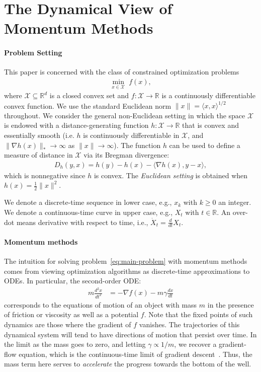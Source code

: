 \documentclass[11pt]{article}
\theoremstyle{plain}
\newcommand{\R}{{\mathbb R}}
\newcommand{\X}{{\mathcal X}}
\begin{document}
\section{The Dynamical View of Momentum Methods}

\paragraph{Problem Setting}
This paper is concerned with the class of constrained optimization problems
\begin{align}\label{eq:main-problem}
\min_{x \in \X} \; f(x),
\end{align}
where $\X \subseteq \R^d$ is a closed convex set and $f \colon \X \to \R$ is a continuously differentiable convex function. 
We use the standard Euclidean norm $\|x\| = \langle x,x \rangle^{1/2}$ throughout.
We consider the general non-Euclidean setting in which the space $\X$ is endowed with a distance-generating function $h \colon \X \to \R$ that is convex and essentially smooth (i.e. $h$ is continuously differentiable in $\X$, and $\|\nabla h(x)\|_* \to \infty$ as $\|x\| \to \infty$). The function $h$ can be used to define a measure of distance in $\X$ via its Bregman divergence:
\begin{align*}
D_h(y,x) = h(y) - h(x) - \langle \nabla h(x), y-x \rangle,
\end{align*}
which is nonnegative since $h$ is convex. 
The \emph{Euclidean setting} is obtained when $h(x) = \frac{1}{2} \|x\|^2$.

We denote a discrete-time sequence in lower case, e.g., $x_k$ with $k \ge 0$ an integer. We denote a continuous-time curve in upper case, e.g., $X_t$ with $t \in \R$. An over-dot means derivative with respect to time, i.e., $\dot X_t = \frac{d}{dt} X_t$.


\paragraph{Momentum methods}
The intuition for solving problem~\eqref{eq:main-problem} with momentum methods comes from viewing optimization algorithms as discrete-time approximations to ODEs. In particular, the second-order ODE:
 \begin{align}\label{eq:heavy-ball-ode}
 m \frac{d^2x}{dt^2}& = - \nabla f(x) - m \gamma \frac{dx}{dt}
 \end{align}
corresponds to the equations of motion of an object with mass $m$ in the presence of  friction or viscosity as well as a potential $f$.  Note that the fixed points of such dynamics are those where the gradient of $f$ vanishes.   The trajectories of this dynamical system will tend to have directions of motion that persist over time.  In the limit as the mass goes to zero, and letting $\gamma \propto 1/m$, we recover a gradient-flow equation, which is the continuous-time limit of gradient descent~\cite{Acceleration}.  Thus, the mass term here serves to \emph{accelerate} the progress towards the bottom of the well. 
\end{document}
